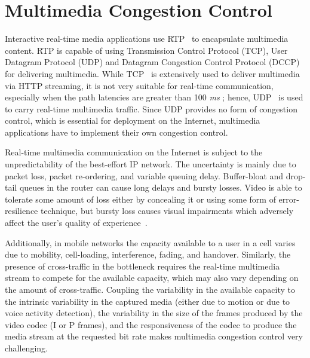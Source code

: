 


\section{Multimedia Congestion Control}

Interactive real-time media applications use RTP~\cite{rfc3550} to encapsulate
multimedia content. RTP is capable of using Transmission Control Protocol (TCP),
User Datagram Protocol (UDP) and Datagram Congestion Control Protocol (DCCP) for delivering
multimedia.  While TCP~\cite{rfc0793} is extensively used to deliver multimedia via
HTTP streaming, it is not very suitable for real-time communication,
especially when the path latencies are greater than 100 \emph{ms} \cite{Brosh:tcp-real-time};
hence, UDP~\cite{rfc0768} is used to carry real-time multimedia traffic. Since
UDP provides no form of congestion control, which is essential for deployment
on the Internet, multimedia applications have to implement their own congestion control.

Real-time multimedia communication on the Internet is subject to the
unpredictability of the best-effort IP network. The uncertainty is mainly due
to packet loss, packet re-ordering, and variable queuing delay.  Buffer-bloat
\cite{gettys:bufferbloat} and drop-tail queues in the router  can cause long
delays and bursty losses. Video is able to tolerate some amount of loss
either by concealing it or using some form of error-resilience technique, but
bursty loss causes visual impairments which adversely affect the user's
quality of experience~\cite{Zink03subjectiveimpression}.

Additionally, in mobile networks the capacity available to a user in a cell
varies due to mobility, cell-loading, interference, fading, and handover.
Similarly, the presence of cross-traffic in the bottleneck requires the real-time
multimedia stream to compete for the available capacity, which may also
vary depending on the amount of cross-traffic.  Coupling the variability in
the available capacity to  the intrinsic variability in the captured media
(either due to motion or due  to voice activity detection), the variability in the
size of the frames produced  by the video codec (I or P frames), and the
responsiveness of the codec to produce the media stream at the requested bit
rate makes multimedia congestion control very challenging.


